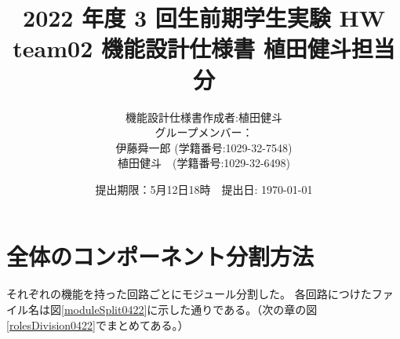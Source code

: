\documentclass[a4j,titlepage]{jarticle}
\begin{document}
\title{2022 年度 3 回生前期学生実験 HW  \\ \bf team02 機能設計仕様書 植田健斗担当分}
\author{機能設計仕様書作成者:植田健斗\\
グループメンバー：\\伊藤舜一郎 (学籍番号:1029-32-7548)
\\植田健斗　(学籍番号:1029-32-6498)}
\date{提出期限：5月12日18時　提出日: \today} %
\maketitle
\newpage


\section{全体のコンポーネント分割方法}

それぞれの機能を持った回路ごとにモジュール分割した。
各回路につけたファイル名は図\ref{moduleSplit0422}に示した通りである。（次の章の図\ref{rolesDivision0422}でまとめてある。）
\end{document}
